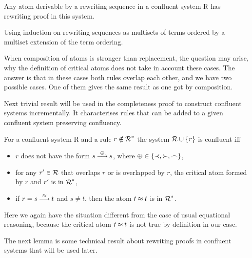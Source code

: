 \begin{LEMMA} \label{le:proofs-in-confluent}
Any atom derivable by a rewriting sequence in a confluent system \C R has
rewriting proof in this system.
\end{LEMMA}
\begin{PROOF}
Using induction on rewriting sequences as multisets of terms ordered by a
multiset extension of the term ordering. 

When composition of atoms is stronger than replacement, 
the question may arise, why the definition of critical atoms does not take in
account these cases. The answer is that in
these cases both rules overlap each other, and we have two possible cases.
One of them gives the same result as one got by composition.
\end{PROOF}

Next trivial result will be used in the completeness proof to construct confluent
systems incrementally. It characterises rules that can be added to a given
confluent system preserving confluency. 

\begin{LEMMA} \label{le:preserve-confluency}
For a confluent system \C R and a rule $r\notin\mbox{$\cal R$}^\ast$ the system \(\mbox{$\cal R$}\cup
\{r\}\) is confluent iff
\begin{itemize}\MyLPar
\item $r$ does not have the form  \(s\mathbin{\stackrel{\oplus}{\longrightarrow}} s\), where
 \(\oplus\in\{\mathbin{\prec},\mathbin{\succ},\mathbin{\frown}\}\), 
\item for any  $r'\in \mbox{$\cal R$}$ that overlaps $r$ or is overlapped by $r$, 
the critical atom formed by $r$ and $r'$ is in $\mbox{$\cal R$}^\ast$,
\item if $r = s\mathbin{\stackrel{\mathbin{\approx}}{\longrightarrow}} t$ and \(s\ne t\), then
 the atom \(t\mathbin{\approx} t\) is in $\mbox{$\cal R$}^\ast$.
\end{itemize}
\end{LEMMA}
Here we again have the situation different  from the case of usual equational
reasoning, because the critical atom \(t \mathbin{\approx} t\) is not true by definition in our
case.

The next lemma is some technical result about rewriting proofs in confluent
systems that will be used later.

